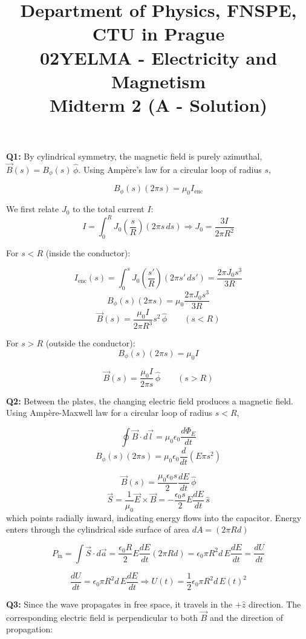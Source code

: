 \documentclass[a4paper,12pt]{article}
\title{{\large Department of Physics, FNSPE, CTU in Prague} \\
                  02YELMA - Electricity and Magnetism \\ 
          {\Large \textbf{Midterm 2 (A - Solution)}}\vspace{-1cm}}
\date{}
\author{}
\begin{document}
\maketitle

\textbf{Q1:} By cylindrical symmetry, the magnetic field is purely azimuthal, $\vec B(s)=B_\phi(s)\,\hat\phi$. Using Ampère’s law for a circular loop of radius \(s\),

\[
B_\phi(s)(2\pi s)=\mu_0 I_{\text{enc}}
\]

We first relate \(J_0\) to the total current \(I\):
\[
I=\int_0^R J_0\left(\frac{s}{R}\right)(2\pi s\,ds) \Rightarrow \boxed{J_0=\frac{3I}{2\pi R^2}}
\]

For \(s<R\) (inside the conductor):

\[
I_{\text{enc}}(s)=\int_0^s J_0\left(\frac{s'}{R}\right)(2\pi s' \, ds')
=\frac{2\pi J_0 s^3}{3R}
\]
\[
B_\phi(s)(2\pi s)=\mu_0 \frac{2\pi J_0 s^3}{3R}
\]
\[
\boxed{
\vec B(s)=\frac{\mu_0 I}{2\pi R^3}s^2\,\hat\phi
\qquad (s<R)
}
\]

For \(s>R\) (outside the conductor):
\[
B_\phi(s)(2\pi s)=\mu_0 I
\]

\[
\boxed{
\vec B(s)=\frac{\mu_0 I}{2\pi s}\,\hat\phi
\qquad (s>R)
}
\]


\vspace*{0.3cm}
\textbf{Q2:} Between the plates, the changing electric field produces a magnetic field. Using Ampère-Maxwell law for a circular loop of radius \(s<R\),

\[
\oint \vec B\cdot d\vec l
=
\mu_0\epsilon_0
\frac{d\Phi_E}{dt}
\]
\[
B_\phi(s)(2\pi s)
=
\mu_0\epsilon_0
\frac{d}{dt}\left(E\pi s^2\right)
\]

\[
\vec B(s)
=
\frac{\mu_0\epsilon_0 s}{2}
\frac{dE}{dt}\,\hat\phi
\]
\[
\vec S
=
\frac{1}{\mu_0}\vec E\times\vec B =
-\frac{\epsilon_0 s}{2}
E\frac{dE}{dt}\,\hat s
\]
which points radially inward, indicating energy flows into the capacitor. Energy enters through the cylindrical side surface of area $dA=(2\pi R d)$

\[
P_{\text{in}}
=
\int \vec S\cdot d\vec a
=
\frac{\epsilon_0 R}{2}
E\frac{dE}{dt}(2\pi R d) = \epsilon_0\pi R^2 d\,
E\frac{dE}{dt} = \frac{dU}{dt}
\]

\[
\frac{dU}{dt}
=
\epsilon_0\pi R^2 d\,
E\frac{dE}{dt} \Rightarrow \boxed{
U(t)
=
\frac{1}{2}\epsilon_0\pi R^2 d\,E(t)^2
}
\]


\vspace*{0.3cm}
\textbf{Q3:} Since the wave propagates in free space, it travels in the \(+\hat z\) direction. The corresponding electric field is perpendicular to both \(\vec B\) and the direction of propagation:
\end{document}
